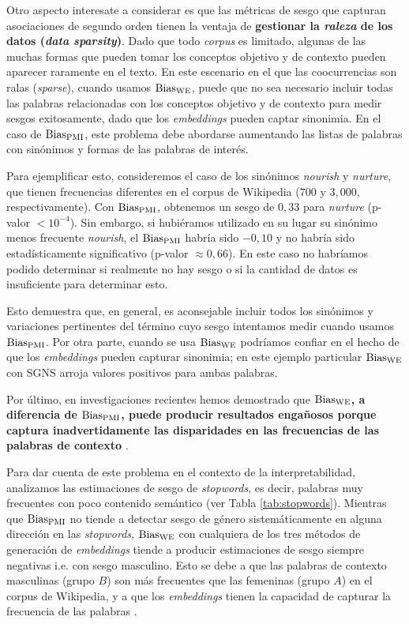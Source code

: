 Otro aspecto interesate a considerar es que las métricas de sesgo que capturan asociaciones de segundo orden tienen la ventaja de \textbf{gestionar la \emph{raleza} de los datos (\emph{data sparsity})}. Dado que todo \emph{corpus} es limitado, algunas de las muchas formas que pueden tomar los conceptos objetivo y de contexto pueden aparecer raramente en el texto. En este escenario en el que las coocurrencias son ralas (\emph{sparse}), cuando usamos $\operatorname{Bias_{WE}}$, puede que no sea necesario incluir todas las palabras relacionadas con los conceptos objetivo y de contexto para medir sesgos exitosamente, dado que los \emph{embeddings} pueden captar sinonimia. En el caso de $\operatorname{Bias_{PMI}}$, este problema debe abordarse aumentando las listas de palabras con sinónimos y formas de las palabras de interés.

Para ejemplificar esto, consideremos el caso de los sinónimos \emph{nourish} y \emph{nurture}, que tienen frecuencias diferentes en el corpus de Wikipedia ($700$ y $3,000$, respectivamente). Con $\operatorname{Bias_{PMI}}$, obtenemos un sesgo de $0,33$ para \emph{nurture} (p-valor $< 10^{-4}$). Sin embargo, si hubiéramos utilizado en su lugar su sinónimo menos frecuente \emph{nourish}, el $\operatorname{Bias_{PMI}}$ habría sido $-0,10$ y no habría sido estadísticamente significativo (p-valor $\approx 0,66$). En este caso no habríamos podido determinar si realmente no hay sesgo o si la cantidad de datos es insuficiente para determinar esto. 

Esto demuestra que, en general, es aconsejable incluir todos los sinónimos y variaciones pertinentes del término cuyo sesgo intentamos medir cuando usamos $\operatorname{Bias_{PMI}}$. Por otra parte, cuando se usa $\operatorname{Bias_{WE}}$ podríamos confiar en el hecho de que los \emph{embeddings} pueden capturar sinonimia; en este ejemplo particular $\operatorname{Bias_{WE}}$ con SGNS arroja valores positivos para ambas palabras.

Por último, en investigaciones recientes hemos demostrado que \textbf{$\operatorname{Bias_{WE}}$, a diferencia de $\operatorname{Bias_{PMI}}$, puede producir resultados engañosos porque captura inadvertidamente las disparidades en las frecuencias de las palabras de contexto} \citep{valentini2022undesirable}. 

Para dar cuenta de este problema en el contexto de la interpretabilidad, analizamos las estimaciones de sesgo de \emph{stopwords}, es decir, palabras muy frecuentes con poco contenido semántico (ver Tabla \ref{tab:stopwords}). Mientras que $\operatorname{Bias_{PMI}}$ no tiende a detectar sesgo de género sistemáticamente en alguna dirección en las \emph{stopwords}, $\operatorname{Bias_{WE}}$ con cualquiera de los tres métodos de generación de \emph{embeddings} tiende a producir estimaciones de sesgo siempre negativas i.e. con sesgo masculino. Esto se debe a que las palabras de contexto masculinas (grupo $B$) son más frecuentes que las femeninas (grupo $A$) en el corpus de Wikipedia, y a que los \emph{embeddings} tienen la capacidad de capturar la frecuencia de las palabras \citep
{valentini2022undesirable}. 

